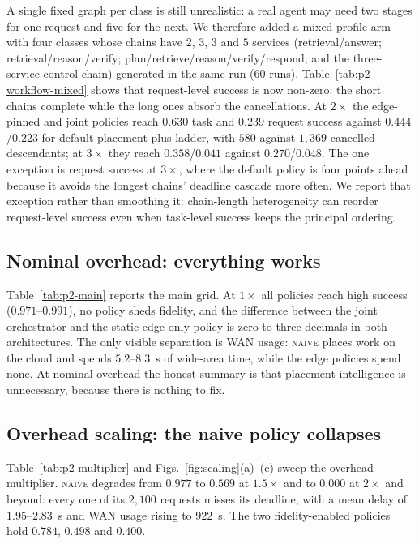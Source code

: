 \documentclass[journal,10pt]{IEEEtran}
\begin{document}
A single fixed graph per class is still unrealistic: a real agent may need two
stages for one request and five for the next. We therefore added a mixed-profile
arm with four classes whose chains have $2$, $3$, $3$ and $5$ services
(retrieval/answer; retrieval/reason/verify; plan/retrieve/reason/verify/respond;
and the three-service control chain) generated in the same run ($60$ runs).
Table~\ref{tab:p2-workflow-mixed} shows that request-level success is now
non-zero: the short chains complete while the long ones absorb the cancellations.
At $2\times$ the edge-pinned and joint policies reach $0.630$ task and $0.239$
request success against $0.444$/$0.223$ for default placement plus ladder, with
$580$ against $1{,}369$ cancelled descendants; at $3\times$ they reach
$0.358$/$0.041$ against $0.270$/$0.048$. The one exception is request success at
$3\times$, where the default policy is four points ahead because it avoids the
longest chains' deadline cascade more often. We report that exception rather than
smoothing it: chain-length heterogeneity can reorder request-level success even
when task-level success keeps the principal ordering.



\subsection{Nominal overhead: everything works}


Table~\ref{tab:p2-main} reports the main grid. At $1\times$ all policies reach
high success ($0.971$--$0.991$), no policy sheds fidelity, and the difference
between the joint orchestrator and the static edge-only policy is zero to three
decimals in both architectures. The only visible separation is WAN usage:
\textsc{naive} places work on the cloud and spends $5.2$--$8.3$~s of wide-area
time, while the edge policies spend none. At nominal overhead the honest summary
is that placement intelligence is unnecessary, because there is nothing to fix.

\subsection{Overhead scaling: the naive policy collapses}


Table~\ref{tab:p2-multiplier} and Figs.~\ref{fig:scaling}(a)--(c) sweep the
overhead multiplier. \textsc{naive} degrades from $0.977$ to $0.569$ at
$1.5\times$ and to $0.000$ at $2\times$ and beyond: every one of its $2{,}100$
requests misses its deadline, with a mean delay of $1.95$--$2.83$~s and WAN usage
rising to $922$~s. The two fidelity-enabled policies hold $0.784$, $0.498$ and
$0.400$.
\end{document}
